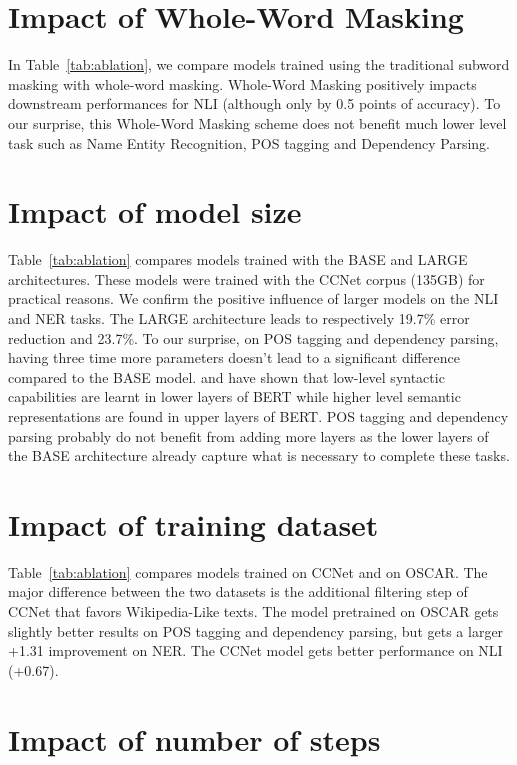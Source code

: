\documentclass[11pt,a4paper]{article}
\newcommand{\bert}{BERT\xspace}
\newcommand{\ccnet}{CCNet\xspace}
\newcommand{\oscar}{OSCAR\xspace}
\begin{document}
\section{Impact of Whole-Word Masking}
In Table~\ref{tab:ablation}, we compare models trained using the traditional subword masking with whole-word masking.
Whole-Word Masking positively impacts downstream performances for NLI (although only by 0.5 points of accuracy). To our surprise, this Whole-Word Masking scheme does not benefit much lower level task such as Name Entity Recognition, POS tagging and Dependency Parsing.



\section{Impact of model size}
Table~\ref{tab:ablation} compares models trained with the BASE and LARGE architectures.
These models were trained with the \ccnet corpus (135GB) for practical reasons.
We confirm the positive influence of larger models on the NLI and NER tasks. The LARGE architecture leads to respectively 19.7\% error reduction and 23.7\%.
To our surprise, on POS tagging and dependency parsing, having three time more parameters doesn't lead to a significant  difference compared to the BASE model.
 and  have shown that low-level syntactic capabilities are learnt in lower layers of \bert while higher level semantic representations are found in upper layers of \bert.
POS tagging and dependency parsing probably do not benefit from adding more layers as the lower layers of the BASE architecture already capture what is necessary to complete these tasks.


\section{Impact of training dataset}

Table~\ref{tab:ablation} compares models trained on \ccnet and on \oscar.
The major difference between the two datasets is the additional filtering step of \ccnet that favors Wikipedia-Like texts.
The model pretrained on \oscar gets slightly better results on POS tagging and dependency parsing, but gets a larger +1.31 improvement on NER.
The \ccnet model gets better performance on NLI (+0.67).

\section{Impact of number of steps}
\label{sec:nbsteps}
\end{document}

